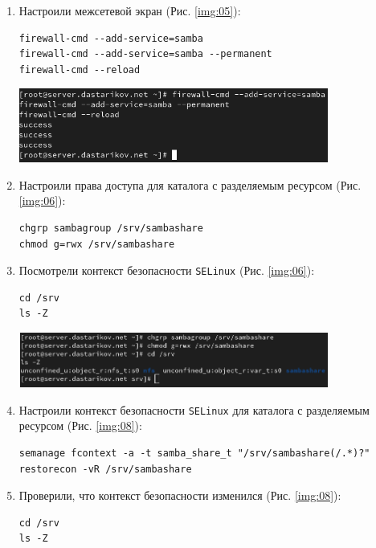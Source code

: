 \begin{enumerate}
\item Настроили межсетевой экран (Рис. \ref{img:05}):
    \begin{verbatim}
firewall-cmd --add-service=samba
firewall-cmd --add-service=samba --permanent
firewall-cmd --reload
    \end{verbatim}

\begin{center}
    \centering
    \includegraphics[width=0.8\textwidth]{../images/image05.png}
    \label{img:05}
\end{center}

\item Настроили права доступа для каталога с разделяемым ресурсом (Рис. \ref{img:06}):
    \begin{verbatim}
chgrp sambagroup /srv/sambashare
chmod g=rwx /srv/sambashare
    \end{verbatim}
\item Посмотрели контекст безопасности {\tt SELinux} (Рис. \ref{img:06}):
    \begin{verbatim}
cd /srv
ls -Z
    \end{verbatim}

\begin{center}
    \centering
    \includegraphics[width=0.8\textwidth]{../images/image06.png}
    \label{img:06}
\end{center}

\item Настроили контекст безопасности {\tt SELinux} для каталога с разделяемым ресурсом (Рис. \ref{img:08}):
    \begin{verbatim}
semanage fcontext -a -t samba_share_t "/srv/sambashare(/.*)?"
restorecon -vR /srv/sambashare
    \end{verbatim}
\item Проверили, что контекст безопасности изменился (Рис. \ref{img:08}):
    \begin{verbatim}
cd /srv
ls -Z
    \end{verbatim}


\end{enumerate}
